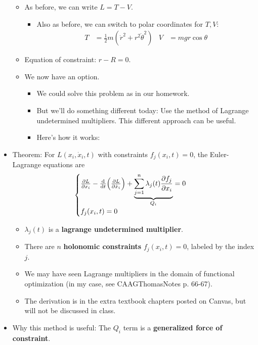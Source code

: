 \documentclass[../notes.tex]{subfiles}
\begin{document}
\begin{itemize}
\begin{itemize}
        \item As before, we can write $L=T-V$.
        \begin{itemize}
            \item Also as before, we can switch to polar coordinates for $T,V$:
            \begin{align*}
                T &= \frac{1}{2}m(\dot{r}^2+r^2\dot{\theta}^2)&
                V &= mgr\cos\theta
            \end{align*}
        \end{itemize}
        \item Equation of constraint: $r-R=0$.
        \item We now have an option.
        \begin{itemize}
            \item We could solve this problem as in our homework.
            \item But we'll do something different today: Use the method of Lagrange undetermined multipliers. This different approach can be useful.
            \item Here's how it works:
        \end{itemize}
    \end{itemize}
    \item Theorem: For $L(x_i,\dot{x}_i,t)$ with constraints $f_j(x_i,t)=0$, the Euler-Lagrange equations are
    \begin{equation*}
        \begin{cases}
            \pdv{L}{x_i}-\dv{t}(\pdv{L}{\dot{x}_i})+\underbrace{\sum_{j=1}^n\lambda_j(t)\pdv{f_j}{x_i}}_{Q_i} = 0\\
            f_j(x_i,t) = 0
        \end{cases}
    \end{equation*}
    \begin{itemize}
        \item $\lambda_j(t)$ is a \textbf{lagrange undetermined multiplier}.
        \item There are $n$ \textbf{holonomic constraints} $f_j(x_i,t)=0$, labeled by the index $j$.
        \item We may have seen Lagrange multipliers in the domain of functional optimization (in my case, see CAAGThomasNotes p. 66-67).
        \item The derivation is in the extra textbook chapters posted on Canvas, but will not be discussed in class.
    \end{itemize}
    \item Why this method is useful: The $Q_i$ term is a \textbf{generalized force of constraint}.

\end{itemize}
\end{document}
